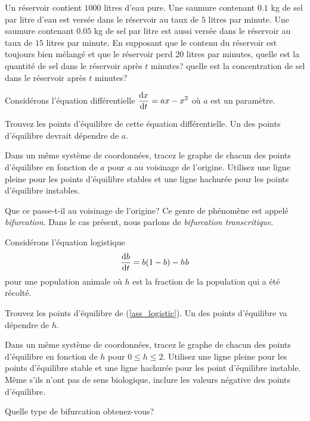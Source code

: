 \begin{question}[\eng]
Un réservoir contient $1000$ litres d'eau pure.  Une saumure contenant
$0.1$ kg de sel par litre d'eau est versée dans le réservoir au taux
de $5$ litres par minute.  Une saumure contenant $0.05$ kg de sel par
litre est aussi versée dans le réservoir au taux de $15$ litres par
minute.  En supposant que le contenu du réservoir est toujours bien
mélangé et que le réservoir perd $20$ litres par minutes, quelle est
la quantité de sel dans le réservoir après $t$ minutes?  quelle est la
concentration de sel dans le réservoir après $t$ minutes?
\label{10Q54}
\end{question}

\begin{question}[\life]
Considérons l'équation différentielle $\displaystyle \frac{\mathrm{d}x}{\mathrm{d}t} = a x - x^2$
où $a$ est un paramètre.

 Trouvez les points d'équilibre de cette équation différentielle.  Un
des points d'équilibre devrait dépendre de $a$.

 Dans un même système de coordonnées, tracez le graphe de chacun des
points d'équilibre en fonction de $a$ pour $a$ au voisinage de l'origine.
Utilisez une ligne pleine pour les points d'équilibre stables et une ligne
hachurée pour les points d'équilibre instables.

 Que ce passe-t-il au voisinage de l'origine?  Ce genre de phénomène
est appelé {\em bifurcation}.  Dans le cas présent, nous parlons de
{\em bifurcation transcritique}.
\label{10Q55}
\end{question}

\begin{question}[\life]
Considérons l'équation logistique
\begin{equation}\label{ass_logistic}
\frac{\mathrm{d}b}{\mathrm{d}t} = b(1-b) - hb
\end{equation}
pour une population animale où $h$ est la fraction de la population qui a été
récolté.

 Trouvez les points d'équilibre de (\ref{ass_logistic}).  Un des
points d'équilibre va dépendre de $h$.

 Dans un même système de coordonnées, tracez le graphe de chacun des
points d'équilibre en fonction de $h$ pour $0\leq h \leq 2$.  Utilisez une
ligne pleine pour les points d'équilibre stable et une ligne hachurée pour
les point d'équilibre instable.  Même s'ils n'ont pas de sens biologique,
inclure les valeurs négative des points d'équilibre.

 Quelle type de bifurcation obtenez-vous?
\label{10Q56}
\end{question}

